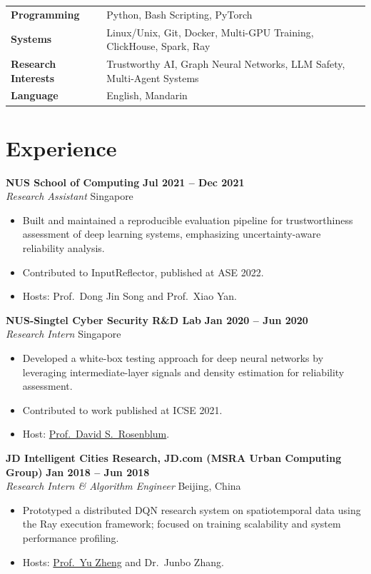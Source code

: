 \documentclass[11pt, a4paper]{article}
\newcommand{\entry}[4]{%
    \textbf{#1} \hfill \textbf{#2} \\
    \textit{#3} \hfill #4
    \vspace{0.15em}
}
\newenvironment{bullets}{
    \begin{itemize}[
        leftmargin=1.2em,
        itemsep=0.08em,
        parsep=0pt,
        topsep=0.12em
    ]
}{
    \end{itemize}
    \vspace{0.2em}
}
\begin{document}
\begin{tabularx}{\textwidth}{@{} >{\bfseries}l X @{}}
    Programming  & Python, Bash Scripting, PyTorch \\
    Systems      & Linux/Unix, Git, Docker, Multi-GPU Training, ClickHouse, Spark, Ray \\
    Research Interests & Trustworthy AI, Graph Neural Networks, LLM Safety, Multi-Agent Systems \\
    Language     & English, Mandarin
\end{tabularx}

\section{Experience}

\entry{NUS School of Computing}{Jul 2021 -- Dec 2021}
      {Research Assistant}{Singapore}
\begin{bullets}
    \item Built and maintained a reproducible evaluation pipeline for trustworthiness assessment of deep learning systems, emphasizing uncertainty-aware reliability analysis.
    \item Contributed to InputReflector, published at ASE 2022.
    \item Hosts: Prof.\ Dong Jin Song and Prof.\ Xiao Yan.
\end{bullets}

\entry{NUS-Singtel Cyber Security R\&D Lab}{Jan 2020 -- Jun 2020}
      {Research Intern}{Singapore}
\begin{bullets}
    \item Developed a white-box testing approach for deep neural networks by leveraging intermediate-layer signals and density estimation for reliability assessment.
    \item Contributed to work published at ICSE 2021.
    \item Host: \href{https://people.cs.gmu.edu/~dsr/}{Prof.\ David S.\ Rosenblum}.
\end{bullets}

\entry{JD Intelligent Cities Research, JD.com (MSRA Urban Computing Group)}{Jan 2018 -- Jun 2018}
      {Research Intern \& Algorithm Engineer}{Beijing, China}
\begin{bullets}
    \item Prototyped a distributed DQN research system on spatiotemporal data using the Ray execution framework; focused on training scalability and system performance profiling.
    \item Hosts: \href{http://urban-computing.com/yuzheng}{Prof.\ Yu Zheng} and Dr.\ Junbo Zhang.
\end{bullets}
\end{document}
